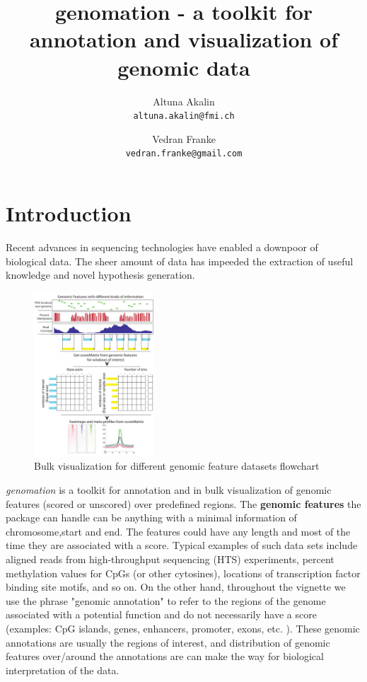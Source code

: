 \documentclass{article}\usepackage[]{graphicx}\usepackage[]{color}
\title{genomation - a toolkit for annotation and visualization of genomic data}
\author{Altuna Akalin\\ \texttt{altuna.akalin@fmi.ch}\\
\and
Vedran Franke \\ \texttt{vedran.franke@gmail.com} }
\newcommand{\Rpackage}[1]{{\textit{#1}}}
\begin{document}
\maketitle
\tableofcontents

\section{Introduction}

Recent advances in sequencing technologies have enabled a downpoor of biological data. The sheer amount of data has impeeded the extraction of useful knowledge and novel hypothesis generation.
\begin{figure}
 \vspace{-20pt}
  \begin{center}
    \includegraphics[width=0.4\textwidth]{Figures/genomationFlowChart1.pdf}
  \end{center}
  \caption{Bulk visualization for different genomic feature datasets flowchart}
   \vspace{-20pt}
\end{figure} 
\Rpackage{genomation} is a toolkit for annotation and in bulk visualization of 
genomic features (scored or unscored) over predefined regions. The \textbf{genomic features} the package can handle can be  anything with a minimal information of chromosome,start and end. The features could have any length
and most of the time they are associated with a score. Typical examples of such data sets include aligned reads from high-throughput sequencing (HTS) experiments, percent
methylation values for CpGs (or other cytosines), locations of transcription factor binding site motifs, and so on. On the other hand, throughout the vignette we use the phrase "genomic annotation" to refer to the regions of the genome associated with a potential function and do not necessarily have a score (examples: CpG islands, genes, enhancers, promoter, exons, etc. ). These genomic annotations are usually the regions of interest, and distribution of genomic features over/around the annotations are can make the way for biological interpretation of the data.
\end{document}
